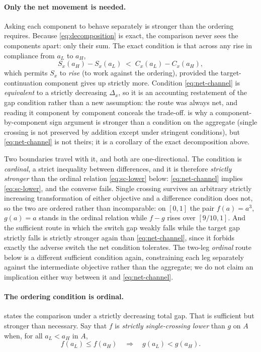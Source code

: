 \paragraph{Only the net movement is needed.}
Asking each component to behave separately is stronger than the ordering requires.
Because \eqref{eq:decomposition} is exact, the comparison never sees the components
apart: only their sum. The exact condition is that across any rise in
compliance from $a_L$ to $a_H$,
\begin{equation}
S_x(a_H)-S_x(a_L)\;<\;C_x(a_L)-C_x(a_H),
\label{eq:net-channel}
\end{equation}
which permits $S_x$ to \emph{rise} (to work against the ordering), provided
the target-continuation component gives up strictly more. Condition
\eqref{eq:net-channel} is \emph{equivalent} to a strictly decreasing $\Delta_x$,
so it is an accounting restatement of the gap condition rather than a new
assumption: the route was always net, and reading it component by component conceals
the trade-off. \citet{QuahStrulovici2012} is why a component-by-component sign
argument is stronger than a condition on the aggregate (single crossing is not
preserved by addition except under stringent conditions), but
\eqref{eq:net-channel} is not theirs; it is a corollary of the exact
decomposition above.

Two boundaries travel with it, and both are one-directional. The condition is
\emph{cardinal}, a strict inequality between differences, and it is therefore
\emph{strictly stronger} than the ordinal relation \eqref{eq:sc-lower} below:
\eqref{eq:net-channel} implies \eqref{eq:sc-lower}, and the converse fails.
Single crossing survives an arbitrary strictly increasing transformation of
either objective and a difference condition does not, so the two are ordered
rather than incomparable: on $[0,1]$ the pair $f(a)=a^{3}$, $g(a)=a$ stands in
the ordinal relation while $f-g$ rises over $[9/10,1]$. And the sufficient route
in which the switch gap weakly falls while the target gap strictly falls is
strictly stronger again than \eqref{eq:net-channel}, since it forbids exactly the
adverse switch the net condition tolerates. The two-leg \emph{ordinal} route below is a
different sufficient condition again, constraining each leg separately against
the intermediate objective rather than the aggregate; we do not claim an
implication either way between it and \eqref{eq:net-channel}.

\paragraph{The ordering condition is ordinal.}
 states the comparison under a strictly decreasing total
gap. That is sufficient but stronger than necessary. Say that $f$ is
\emph{strictly single-crossing lower} than $g$ on $A$ when, for all $a_L<a_H$ in
$A$,
\begin{equation}
f(a_L)\le f(a_H)
\quad\Longrightarrow\quad
g(a_L)<g(a_H).
\label{eq:sc-lower}
\end{equation}

